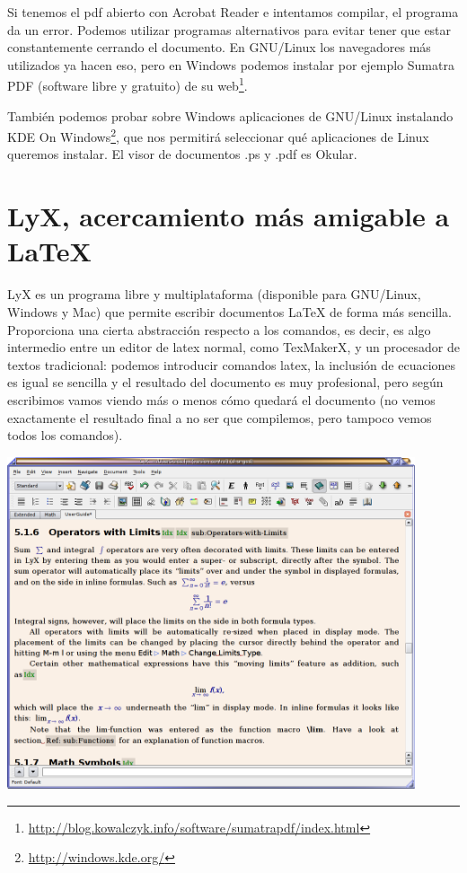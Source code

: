 \documentclass[12pt,a4paper, oneside]{report}
\begin{document}
Si tenemos el pdf abierto con Acrobat Reader  e intentamos compilar, el programa da un error. Podemos utilizar programas alternativos para evitar tener que estar constantemente cerrando el documento. En GNU/Linux los navegadores más utilizados ya hacen eso, pero en Windows podemos instalar por ejemplo Sumatra PDF (software libre y gratuito) de su web\footnote{\url{http://blog.kowalczyk.info/software/sumatrapdf/index.html}}.

También podemos probar sobre Windows aplicaciones de GNU/Linux instalando KDE On Windows\footnote{\url{http://windows.kde.org/}}, que nos permitirá seleccionar qué aplicaciones de Linux queremos instalar. El visor de documentos .ps y .pdf es Okular.



\section{LyX, acercamiento más amigable a \LaTeX}

LyX es un programa libre y multiplataforma (disponible para GNU/Linux, Windows y Mac) que permite escribir documentos \LaTeX{} de forma más sencilla. Proporciona una cierta abstracción respecto a los comandos, es decir, es algo intermedio entre un editor de latex normal, como TexMakerX, y un procesador de textos tradicional: podemos introducir comandos latex, la inclusión de ecuaciones es igual se sencilla y el resultado del documento es muy profesional, pero según escribimos vamos viendo más o menos cómo quedará el documento (no vemos exactamente el resultado final a no ser que compilemos, pero tampoco vemos todos los comandos).

\includegraphics[width=0.9\textwidth]{images/lyx.png}
\end{document}
